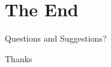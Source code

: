 \documentclass{beamer}
\begin{document}
\section*{The End}

\begin{frame}
\Huge{\centerline{Questions and Suggestions?}}
\end{frame}

\begin{frame}
\Huge{\centerline{Thanks}}
\end{frame}

\end{document}
